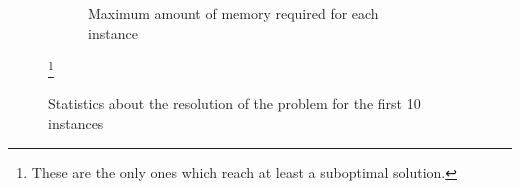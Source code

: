 \begin{figure}[H]
\begin{subfigure}{0.49\linewidth}
        \caption{Maximum amount of memory required for each instance}
    \end{subfigure}
    \caption{Statistics about the resolution of the problem for the first 10 instances}
    \label{fig:sat_plots}\footnote{These are the only ones which reach at least a suboptimal solution.}
\end{figure}